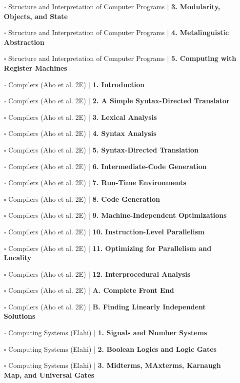 \documentclass[a4, landscape, 12pt]{article}
\newcommand{\checkbox}{$\square$}%
\begin{document}
\begin{itemize}
{}
\item [\checkbox]  Structure and Interpretation of Computer Programs  | \textbf{ 3. Modularity, Objects, and State
}
\item [\checkbox]  Structure and Interpretation of Computer Programs  | \textbf{ 4. Metalinguistic Abstraction
}
\item [\checkbox]  Structure and Interpretation of Computer Programs  | \textbf{ 5. Computing with Register Machines
}
\item [\checkbox]  Compilers (Aho et al. 2E)  | \textbf{ 1. Introduction
}
\item [\checkbox]  Compilers (Aho et al. 2E)  | \textbf{ 2. A Simple Syntax-Directed Translator
}
\item [\checkbox]  Compilers (Aho et al. 2E)  | \textbf{ 3. Lexical Analysis
}
\item [\checkbox]  Compilers (Aho et al. 2E)  | \textbf{ 4. Syntax Analysis
}
\item [\checkbox]  Compilers (Aho et al. 2E)  | \textbf{ 5. Syntax-Directed Translation
}
\item [\checkbox]  Compilers (Aho et al. 2E)  | \textbf{ 6. Intermediate-Code Generation
}
\item [\checkbox]  Compilers (Aho et al. 2E)  | \textbf{ 7. Run-Time Environments
}
\item [\checkbox]  Compilers (Aho et al. 2E)  | \textbf{ 8. Code Generation
}
\item [\checkbox]  Compilers (Aho et al. 2E)  | \textbf{ 9. Machine-Independent Optimizations
}
\item [\checkbox]  Compilers (Aho et al. 2E)  | \textbf{ 10. Instruction-Level Parallelism
}
\item [\checkbox]  Compilers (Aho et al. 2E)  | \textbf{ 11. Optimizing for Parallelism and Locality
}
\item [\checkbox]  Compilers (Aho et al. 2E)  | \textbf{ 12. Interprocedural Analysis
}
\item [\checkbox]  Compilers (Aho et al. 2E)  | \textbf{ A. Complete Front End
}
\item [\checkbox]  Compilers (Aho et al. 2E)  | \textbf{ B. Finding Linearly Independent Solutions
}
\item [\checkbox]  Computing Systems (Elahi)  | \textbf{ 1. Signals and Number Systems
}
\item [\checkbox]  Computing Systems (Elahi)  | \textbf{ 2. Boolean Logics and Logic Gates
}
\item [\checkbox]  Computing Systems (Elahi)  | \textbf{ 3. Midterms, MAxterms, Karnaugh Map, and Universal Gates
}
\end{itemize}
\end{document}
